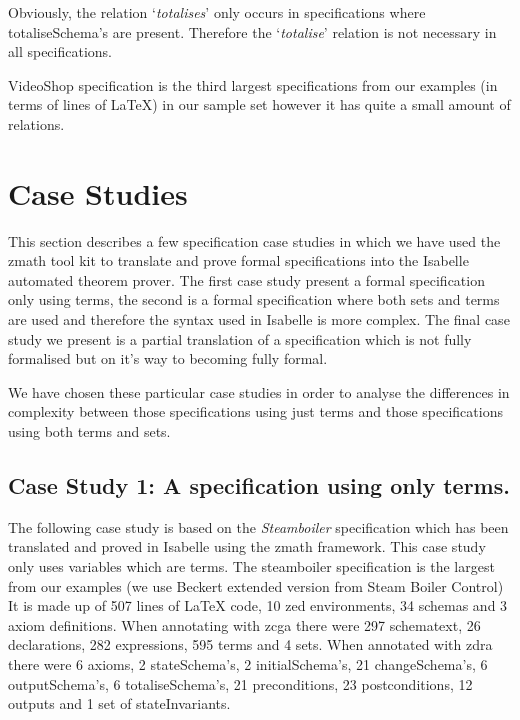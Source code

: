 Obviously, the relation `\emph{totalises}' only occurs in specifications where
totaliseSchema's are present. Therefore the `\emph{totalise}' relation is not
necessary in all specifications.

VideoShop specification is the third largest specifications from our examples (in terms of lines
of \LaTeX{}) in our sample set however it has quite a small amount of relations.

\section{Case Studies}

This section describes a few specification case studies in which we have used
the \gls{zmath} tool kit to translate and prove formal specifications into the
Isabelle automated theorem prover. The first case study present a formal
specification only using terms, the second is a formal specification where both
sets and terms are used and therefore the syntax used in Isabelle is more
complex. The final case study we present is a partial translation of a
specification which is not fully formalised but on it's way to becoming fully
formal.

We have chosen these particular case studies in order to analyse the differences
in complexity between those specifications using just terms and those
specifications using both terms and sets.

\subsection{Case Study 1: A specification using only terms.}
\label{subsec:casestudy1}

The following case study is based on the \emph{Steamboiler}
\cite{steamboilerslides} specification which has been translated and proved in
Isabelle using the \gls{zmath} framework. This case study only uses variables
which are terms. The steamboiler specification is the largest from our examples 
(we use Beckert extended version from Steam Boiler Control)
It is made up of 507 lines of \LaTeX{} code, 10 zed environments, 34 schemas and
3 axiom definitions. When annotating with \gls{zcga} there were 297 schematext,
26 declarations, 282 expressions, 595 terms and 4 sets. When annotated with
\gls{zdra} there were 6 axioms, 2 stateSchema's, 2 initialSchema's, 21
changeSchema's, 6 outputSchema's, 6 totaliseSchema's, 21 preconditions, 23
postconditions, 12 outputs and 1 set of stateInvariants.

